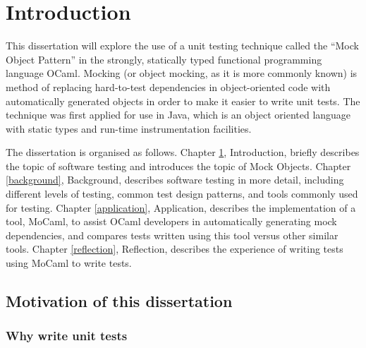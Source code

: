 \chapter{Introduction}
\label{introduction}


This dissertation will explore the use of a unit testing technique
called the ``Mock Object Pattern'' \cite{freeman:mock_roles}
\cite{freeman:evolving} \cite{mackinnon:endo} \cite{meszaros:xunit} in
the strongly, statically typed functional programming language
OCaml. Mocking (or object mocking, as it is more commonly known) is
method of replacing hard-to-test dependencies in object-oriented code
with automatically generated objects in order to make it easier to
write unit tests. The technique was first applied for use in Java,
which is an object oriented language with static types and run-time
instrumentation facilities.


The dissertation is organised as follows. Chapter \ref{introduction},
Introduction, briefly describes the topic of software testing and
introduces the topic of Mock Objects. Chapter \ref{background},
Background, describes software testing in more detail, including
different levels of testing, common test design patterns, and tools
commonly used for testing. Chapter \ref{application}, Application,
describes the implementation of a tool, MoCaml, to assist OCaml
developers in automatically generating mock dependencies, and compares
tests written using this tool versus other similar tools. Chapter
\ref{reflection}, Reflection, describes the experience of writing
tests using MoCaml to write tests.

\section{Motivation of this dissertation}



\subsection{Why write unit tests}

